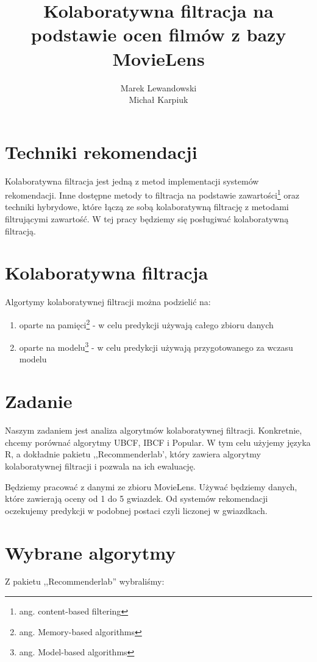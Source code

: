 \documentclass[12pt, a4paper]{article}
\title{\textbf{Kolaboratywna filtracja na podstawie ocen filmów z bazy MovieLens}}
\author{Marek Lewandowski \\ Michał Karpiuk}
\date{}
\begin{document}
\maketitle

\section{Techniki rekomendacji}
Kolaboratywna filtracja jest jedną z metod implementacji systemów rekomendacji. Inne
dostępne metody to filtracja na podstawie zawartości\footnote{ang. content-based filtering}
oraz techniki hybrydowe, które łączą ze sobą kolaboratywną filtrację z metodami
filtrującymi zawartość. W tej pracy będziemy się posługiwać kolaboratywną filtracją.

\section{Kolaboratywna filtracja}
Algortymy kolaboratywnej filtracji można podzielić na:

\begin{enumerate}
\item oparte na pamięci\footnote{ang. Memory-based algorithms} - w celu predykcji używają całego zbioru danych
\item oparte na modelu\footnote{ang. Model-based algorithms} - w celu predykcji używają
przygotowanego za wczasu modelu
\end{enumerate}

\section{Zadanie}
Naszym zadaniem jest analiza algorytmów kolaboratywnej filtracji. Konkretnie, chcemy
porównać algorytmy UBCF, IBCF i Popular. W tym celu użyjemy języka R, a
dokładnie pakietu ,,Recommenderlab', który zawiera algorytmy kolaboratywnej filtracji i
pozwala na ich ewaluację. 

Będziemy pracować z danymi ze zbioru MovieLens. Używać będziemy danych, które zawierają oceny od 1 do 5 gwiazdek. Od systemów rekomendacji oczekujemy predykcji w podobnej postaci czyli liczonej w gwiazdkach.

\section{Wybrane algorytmy}
Z pakietu ,,Recommenderlab'' wybraliśmy:
\end{document}
